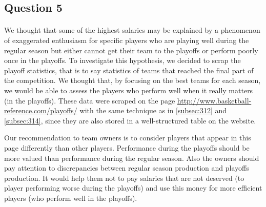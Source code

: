
\subsection{Question 5}
\label{subsec:315}
\paragraph{}We thought that some of the highest salaries may be explained by a phenomenon of exaggerated enthusiasm for specific players who are playing well during the regular season but either cannot get their team to the playoffs or perform poorly once in the playoffs. To investigate this hypothesis, we decided to scrap the playoff statistics, that is to say statistics of teams that reached the final part of the competition. We thought that, by focusing on the best teams for each season, we would be able to assess the players who perform well when it really matters (in the playoffs). These data were scraped on the page \url{http://www.basketball-reference.com/playoffs/} with the same technique as in \ref{subsec:312} and \ref{subsec:314}, since they are also stored in a well-structured table on the website. 

Our recommendation to team owners is to consider players that appear in this page differently than other players. Performance during the playoffs should be more valued than performance during the regular season. Also the owners should pay attention to discrepancies between regular season production and playoffs production. It would help them not to pay salaries that are not deserved (to player performing worse during the playoffs) and use this money for more efficient players (who perform well in the playoffs).